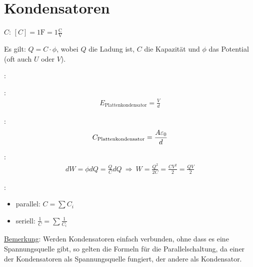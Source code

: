 \section{Kondensatoren}

\vspace{1\baselineskip}

 $C$: $[C] = 1 \text{F} = 1 \frac{\text{C}}{\text{V}}$

Es gilt: $Q = C \cdot \phi$, wobei $Q$ die Ladung ist, $C$ die Kapazität und $\phi$ das
Potential (oft auch $U$ oder $V$).

\vspace{1\baselineskip}

:

\vspace{1\baselineskip}

\begin{minipage}{0.2\textwidth}
    \begin{center}
        :
        \begin{align*}
            E_{\text{Plattenkondensator}} = \frac{V}{d}
        \end{align*}
    \end{center}    
\end{minipage}
\begin{minipage}{0.2\textwidth}
    \begin{center}
        :
        \begin{align*}
            C_{\text{Plattenkondensator}} = \frac{A \varepsilon_0}{d}
        \end{align*}
    \end{center}    
\end{minipage}

\vspace{1\baselineskip}

:
\begin{align*}
    dW = \phi dQ = \frac{Q}{C} dQ
    \ \Rightarrow \
    W = \frac{Q^2}{2 C} = \frac{C V^2}{2} = \frac{Q V}{2}
\end{align*}

\vspace{1\baselineskip}

:
\begin{itemize}
    \item parallel: $C = \sum C_i$
    \item seriell: $\frac{1}{C} = \sum \frac{1}{C_i}$
\end{itemize}
\underline{Bemerkung}: Werden Kondensatoren einfach verbunden, ohne dass es eine
Spannungsquelle gibt, so gelten die Formeln für die Parallelschaltung, da einer der
Kondensatoren als Spannungsquelle fungiert, der andere als Kondensator.
